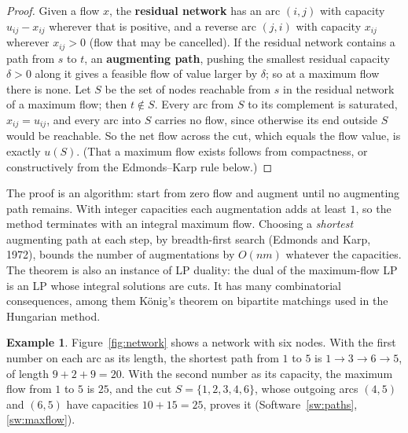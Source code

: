 \documentclass[11pt,a4paper]{article}
\numberwithin{equation}{section}
\theoremstyle{definition}
\newtheorem{exa}[thm]{Example}
\begin{document}
\begin{proof}
Given a flow $x$, the \textbf{residual network} has an arc $(i, j)$ with capacity $u_{ij} - x_{ij}$ wherever that is positive, and a reverse arc $(j, i)$ with capacity $x_{ij}$ wherever $x_{ij} > 0$ (flow that may be cancelled). If the residual network contains a path from $s$ to $t$, an \textbf{augmenting path}, pushing the smallest
residual capacity $\delta > 0$ along it gives a feasible flow of value larger by $\delta$; so at a maximum flow there is none. Let $S$ be the set of nodes reachable from $s$ in the residual network of a maximum flow; then $t \notin S$. Every arc from $S$ to its complement is saturated, $x_{ij} = u_{ij}$, and every arc
into $S$ carries no flow, since otherwise its end outside $S$ would be reachable. So the net flow across the cut, which equals the flow value, is exactly $u(S)$. (That a maximum flow exists follows from compactness, or constructively from the Edmonds--Karp rule below.)
\end{proof}

The proof is an algorithm: start from zero flow and augment until no augmenting path remains. With integer capacities each augmentation adds at least $1$, so the method terminates with an integral maximum flow. Choosing a \emph{shortest} augmenting path at each step, by breadth-first search (Edmonds and Karp, 1972), bounds the number of
augmentations by $O(nm)$ whatever the capacities. The theorem is also an instance of LP duality: the dual of the maximum-flow LP is an LP whose integral solutions are cuts. It has many combinatorial consequences, among them K\"onig's theorem on bipartite matchings used in the Hungarian method.

\begin{exa}
\label{ex:networks}
Figure~\ref{fig:network} shows a network with six nodes. With the first number on each arc as its length, the shortest path from $1$ to $5$ is $1 \to 3 \to 6 \to 5$, of length $9 + 2 + 9 = 20$. With the second number as its capacity, the maximum flow from $1$ to $5$ is $25$, and the cut $S = \{1, 2, 3, 4, 6\}$, whose
outgoing arcs $(4, 5)$ and $(6, 5)$ have capacities $10 + 15 = 25$, proves it (Software~\ref{sw:paths}, \ref{sw:maxflow}).
\end{exa}
\end{document}

